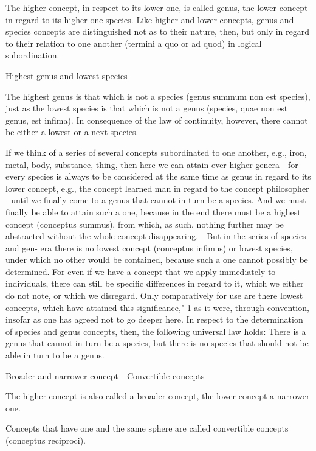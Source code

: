 The higher concept, in respect to its lower one, is called genus,
the lower concept in regard to its higher one species.
Like higher and lower concepts, genus and species concepts are distinguished
not as to their nature, then, but only in regard to their relation to
one another (termini a quo or ad quod) in logical subordination.

Highest genus and lowest species

The highest genus is that which is not a species
(genus summum non est species),
just as the lowest species is that which is not a genus
(species, quae non est genus, est infima).
In consequence of the law of continuity, however,
there cannot be either a lowest or a next species.

    If we think of a series of several concepts subordinated to one another,
    e.g., iron, metal, body, substance, thing, then here we can attain ever
    higher genera - for every species is always to be considered at the same
    time as genus in regard to its lower concept, e.g., the concept learned man
    in regard to the concept philosopher - until we finally come to a genus that
    cannot in turn be a species. And we must finally be able to attain such a
    one, because in the end there must be a highest concept (conceptus
    summus), from which, as such, nothing further may be abstracted without
    the whole concept disappearing. - But in the series of species and gen-
    era there is no lowest concept (conceptus infimus) or lowest species, under
    which no other would be contained, because such a one cannot possibly
    be determined. For even if we have a concept that we apply immediately
    to individuals, there can still be specific differences in regard to it, which
    we either do not note, or which we disregard. Only comparatively for use
    are there lowest concepts, which have attained this significance," 1 as it
    were, through convention, insofar as one has agreed not to go deeper
    here.
    In respect to the determination of species and genus concepts, then, the
    following universal law holds: There is a genus that cannot in turn be a species,
    but there is no species that should not be able in turn to be a genus.

Broader and narrower concept - Convertible concepts

The higher concept is also called a broader concept,
the lower concept a narrower one.

Concepts that have one and the same sphere are called convertible concepts
(conceptus reciproci).

